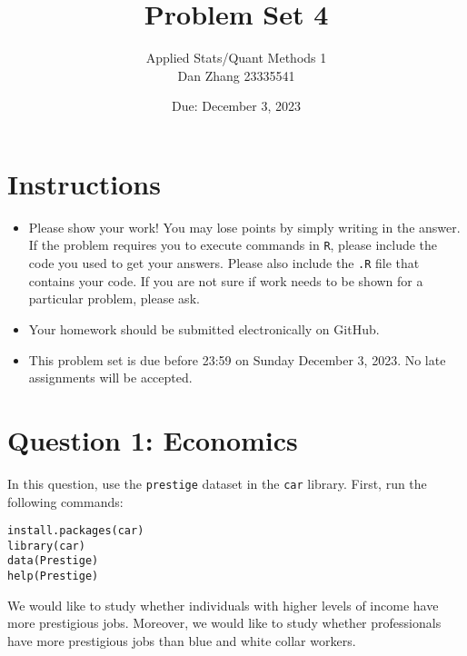 \documentclass[12pt,letterpaper]{article}
\title{Problem Set 4}
\date{Due: December 3, 2023}
\author{Applied Stats/Quant Methods 1 \\ Dan Zhang 23335541}
\begin{document}
	\maketitle
	\section*{Instructions}
	\begin{itemize}
		\item Please show your work! You may lose points by simply writing in the answer. If the problem requires you to execute commands in \texttt{R}, please include the code you used to get your answers. Please also include the \texttt{.R} file that contains your code. If you are not sure if work needs to be shown for a particular problem, please ask.
		\item Your homework should be submitted electronically on GitHub.
		\item This problem set is due before 23:59 on Sunday December 3, 2023. No late assignments will be accepted.
	\end{itemize}



	\vspace{.5cm}
\section*{Question 1: Economics}
\vspace{.25cm}
\noindent 	
In this question, use the \texttt{prestige} dataset in the \texttt{car} library. First, run the following commands:

\begin{verbatim}
install.packages(car)
library(car)
data(Prestige)
help(Prestige)
\end{verbatim} 


\noindent We would like to study whether individuals with higher levels of income have more prestigious jobs. Moreover, we would like to study whether professionals have more prestigious jobs than blue and white collar workers.
\end{document}
